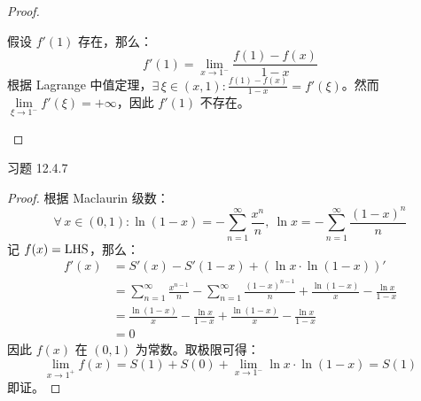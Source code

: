 \begin{problem}
\begin{proof}
\begin{enumerate}
            假设 $f'(1)$ 存在，那么：
            $$
            f'(1) = \lim_{x \to 1^-} \frac{f(1) - f(x)}{1 - x}
            $$
            根据 Lagrange 中值定理，$\exists\,\xi \in (x, 1): \frac{f(1) - f(x)}{1 - x} = f'(\xi)$。然而 $\lim\limits_{\xi \to 1^-} f'(\xi) = + \infty$，因此 $f'(1)$ 不存在。
        \end{enumerate}
    \end{proof}
\end{problem}

\begin{problem}
    习题 12.4.7
    \begin{proof}
        根据 Maclaurin 级数：
        $$
        \forall\,x \in (0, 1): \ln (1 - x) = -\sum_{n = 1}^{\infty} \frac{x^{n}}{n},\ \ln x = -\sum_{n = 1}^{\infty} \frac{(1 - x)^{n}}{n}
        $$
        记 $f(x) = \text{LHS}$，那么：
        $$
        \begin{aligned}
            f'(x) & = S'(x) - S'(1 - x) + (\ln x \cdot \ln (1 - x))' \\
            & = \sum_{n = 1}^{\infty} \frac{x^{n - 1}}{n} - \sum_{n = 1}^{\infty} \frac{(1 - x)^{n - 1}}{n} + \frac{\ln (1 - x)}{x} - \frac{\ln x}{1 - x} \\
            & = \frac{\ln (1 - x)}{x} - \frac{\ln x}{1 - x} + \frac{\ln (1 - x)}{x} - \frac{\ln x}{1 - x} \\
            & = 0
        \end{aligned}
        $$
        因此 $f(x)$ 在 $(0, 1)$ 为常数。取极限可得：
        $$
        \lim_{x \to 1^+} f(x) = S(1) + S(0) + \lim_{x \to 1^-} \ln x \cdot \ln (1 - x) = S(1)
        $$
        即证。
    \end{proof}
\end{problem}


